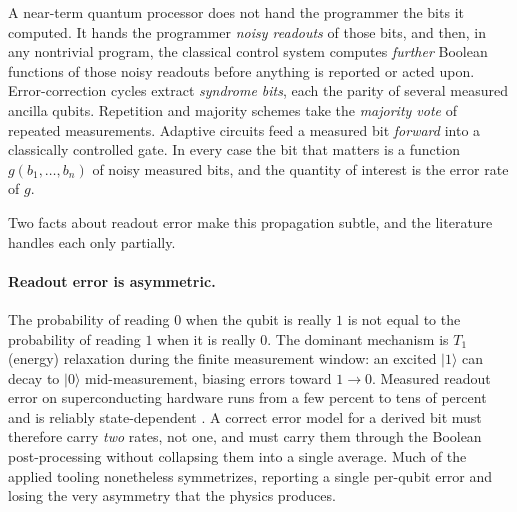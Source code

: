 \documentclass[12pt]{article}
\numberwithin{equation}{section}
\theoremstyle{plain}
\theoremstyle{definition}
\theoremstyle{remark}
\newcommand{\ket}[1]{\lvert #1 \rangle}
\begin{document}
A near-term quantum processor does not hand the programmer the bits it computed.
It hands the programmer \emph{noisy readouts} of those bits, and then, in any
nontrivial program, the classical control system computes \emph{further}
Boolean functions of those noisy readouts before anything is reported or acted
upon. Error-correction cycles extract \emph{syndrome bits}, each the parity of
several measured ancilla qubits. Repetition and majority schemes take the
\emph{majority vote} of repeated measurements. Adaptive circuits feed a measured
bit \emph{forward} into a classically controlled gate. In every case the bit
that matters is a function $g(b_1,\dots,b_n)$ of noisy measured bits, and the
quantity of interest is the error rate of $g$.

Two facts about readout error make this propagation subtle, and the literature
handles each only partially.

\paragraph{Readout error is asymmetric.} The probability of reading $0$ when the
qubit is really $1$ is not equal to the probability of reading $1$ when it is
really $0$. The dominant mechanism is $T_1$ (energy) relaxation during the finite
measurement window: an excited $\ket{1}$ can decay to $\ket{0}$ mid-measurement,
biasing errors toward $1\!\to\!0$. Measured readout error on superconducting
hardware runs from a few percent to tens of percent and is reliably
state-dependent \citep{tannu2019mitigating,hicks2021readout}. A correct error
model for a derived bit must therefore carry \emph{two} rates, not one, and must
carry them through the Boolean post-processing without collapsing them into a
single average. Much of the applied tooling nonetheless symmetrizes, reporting a
single per-qubit error and losing the very asymmetry that the physics produces.
\end{document}
